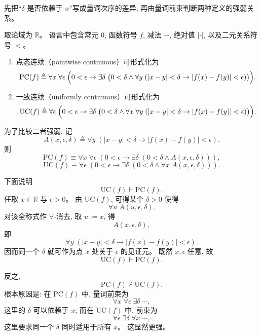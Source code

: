 \documentclass[a4paper, justified]{tufte-handout}
\begin{document}
\begin{solution}
  \begin{intention}
    先把“$\delta$ 是否依赖于 $x$”写成量词次序的差异, 再由量词前束判断两种定义的强弱关系。
  \end{intention}

  取论域为 $\mathbb{R}$。
  语言中包含常元 $0$, 函数符号 $f$, 减法 $-$, 绝对值 $|\cdot|$, 以及二元关系符号 $<$。

  \begin{enumerate}[(1)]
    \item 点态连续（pointwise continuous）可形式化为
      \[
        \mathrm{PC}(f) \triangleq
        \forall x\; \forall \epsilon\; \Bigl(
          0 < \epsilon \to
          \exists \delta\; \bigl(
            0 < \delta
            \land
            \forall y\; (|x - y| < \delta \to |f(x) - f(y)| < \epsilon)
          \bigr)
        \Bigr).
      \]

    \item 一致连续（uniformly continuous）可形式化为
      \[
        \mathrm{UC}(f) \triangleq
        \forall \epsilon\; \Bigl(
          0 < \epsilon \to
          \exists \delta\; \bigl(
            0 < \delta
            \land
            \forall x\; \forall y\; (|x - y| < \delta \to |f(x) - f(y)| < \epsilon)
          \bigr)
        \Bigr).
      \]
  \end{enumerate}

  为了比较二者强弱, 记
  \[
    A(x, \epsilon, \delta) \triangleq
    \forall y\; (|x - y| < \delta \to |f(x) - f(y)| < \epsilon).
  \]
  则
  \[
    \mathrm{PC}(f)
    \equiv
    \forall x\; \forall \epsilon\; (0 < \epsilon \to \exists \delta\; (0 < \delta \land A(x, \epsilon, \delta))),
  \]
  \[
    \mathrm{UC}(f)
    \equiv
    \forall \epsilon\; (0 < \epsilon \to \exists \delta\; (0 < \delta \land \forall x\; A(x, \epsilon, \delta))).
  \]

  下面说明
  \[
    \mathrm{UC}(f) \vdash \mathrm{PC}(f).
  \]
  任取 $x \in \mathbb{R}$ 与 $\epsilon > 0$。
  由 $\mathrm{UC}(f)$, 可得某个 $\delta > 0$ 使得
  \[
    \forall u\; A(u, \epsilon, \delta).
  \]
  对该全称式作 $\forall$-消去, 取 $u := x$, 得
  \[
    A(x, \epsilon, \delta),
  \]
  即
  \[
    \forall y\; (|x - y| < \delta \to |f(x) - f(y)| < \epsilon).
  \]
  因而同一个 $\delta$ 就可作为点 $x$ 处关于 $\epsilon$ 的见证元。
  既然 $x, \epsilon$ 任意, 故
  \[
    \mathrm{UC}(f) \vdash \mathrm{PC}(f).
  \]

  反之,
  \[
    \mathrm{PC}(f) \nvdash \mathrm{UC}(f).
  \]
  根本原因是: 在 $\mathrm{PC}(f)$ 中, 量词前束为
  \[
    \forall x\; \forall \epsilon\; \exists \delta\; \cdots,
  \]
  这里的 $\delta$ 可以依赖于 $x$;
  而在 $\mathrm{UC}(f)$ 中, 前束为
  \[
    \forall \epsilon\; \exists \delta\; \forall x\; \cdots,
  \]
  这里要求同一个 $\delta$ 同时适用于所有 $x$。
  这显然更强。


\end{solution}
\end{document}

